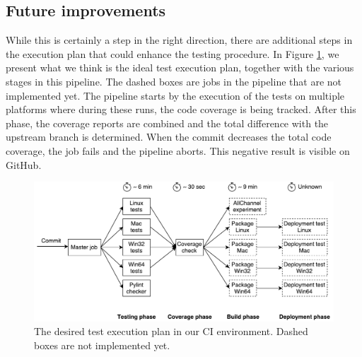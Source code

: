 \subsection{Future improvements}
While this is certainly a step in the right direction, there are additional steps in the execution plan that could enhance the testing procedure. In Figure \ref{fig:jenkins-pipeline}, we present what we think is the ideal test execution plan, together with the various stages in this pipeline. The dashed boxes are jobs in the pipeline that are not implemented yet. The pipeline starts by the execution of the tests on multiple platforms where during these runs, the code coverage is being tracked. After this phase, the coverage reports are combined and the total difference with the upstream branch is determined. When the commit decreases the total code coverage, the job fails and the pipeline aborts. This negative result is visible on GitHub.\\

\begin{figure}[h!]
	\centering
	\includegraphics[width=0.9\columnwidth]{images/improving_qa/jenkins_pipeline}
	\caption{The desired test execution plan in our CI environment. Dashed boxes are not implemented yet.}
	\label{fig:jenkins-pipeline}
\end{figure}


